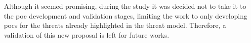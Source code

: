 Although it seemed promising, during the study it was decided not to take it to the \gls{poc} development and validation stages, limiting the work to only developing \glspl{poc} for the threats already highlighted in the threat model. Therefore, a validation of this new proposal is left for future works.